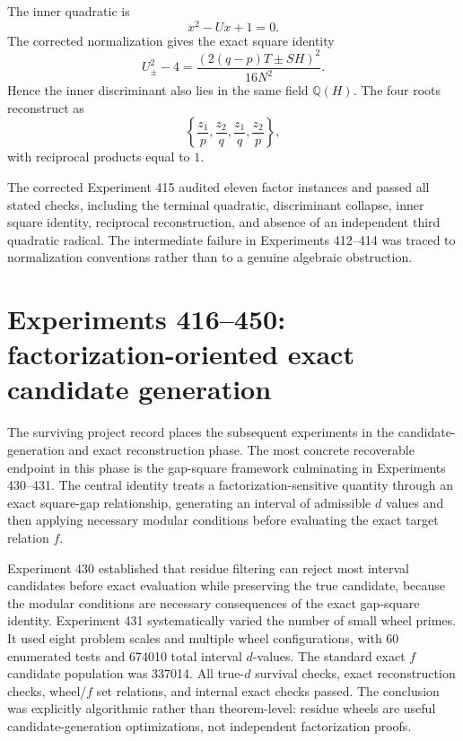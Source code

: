 \documentclass[11pt,a4paper]{article}
\newcommand{\Q}{\mathbb Q}
\begin{document}
The inner quadratic is
\begin{equation}
x^2-Ux+1=0.
\end{equation}
The corrected normalization gives the exact square identity
\begin{equation}
\boxed{U_\pm^2-4
=\frac{\left(2(q-p)T\pm SH\right)^2}{16N^2}.}
\end{equation}
Hence the inner discriminant also lies in the same field $\Q(H)$. The four roots reconstruct as
\begin{equation}
\left\{\frac{z_1}{p},\frac{z_2}{q},\frac{z_1}{q},\frac{z_2}{p}\right\},
\end{equation}
with reciprocal products equal to $1$.

The corrected Experiment 415 audited eleven factor instances and passed all stated checks, including the terminal quadratic, discriminant collapse, inner square identity, reciprocal reconstruction, and absence of an independent third quadratic radical. The intermediate failure in Experiments 412--414 was traced to normalization conventions rather than to a genuine algebraic obstruction.

\section{Experiments 416--450: factorization-oriented exact candidate generation}

The surviving project record places the subsequent experiments in the candidate-generation and exact reconstruction phase. The most concrete recoverable endpoint in this phase is the gap-square framework culminating in Experiments 430--431. The central identity treats a factorization-sensitive quantity through an exact square-gap relationship, generating an interval of admissible $d$ values and then applying necessary modular conditions before evaluating the exact target relation $f$.

Experiment 430 established that residue filtering can reject most interval candidates before exact evaluation while preserving the true candidate, because the modular conditions are necessary consequences of the exact gap-square identity. Experiment 431 systematically varied the number of small wheel primes. It used eight problem scales and multiple wheel configurations, with 60 enumerated tests and 674010 total interval $d$-values. The standard exact $f$ candidate population was 337014. All true-$d$ survival checks, exact reconstruction checks, wheel/$f$ set relations, and internal exact checks passed. The conclusion was explicitly algorithmic rather than theorem-level: residue wheels are useful candidate-generation optimizations, not independent factorization proofs.
\end{document}
